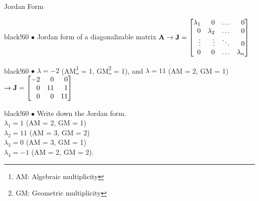 \documentclass[aspectratio=169]{beamer}
\def\mf{\ensuremath\mathbf}
\def\bmx{\ensuremath\begin{bmatrix*}[r]}
\def\emx{\ensuremath\end{bmatrix*}}
\newcommand{\demoex}[2]{\onslide<#1->\begin{color}{black!60} #2 \end{color}}
\begin{document}
\begin{frame}[t]{Jordan Form}
\begin{small}
\demoex{1}{
    $\bullet$ Jordan form of a diagonalizable matrix $\mf{A} \rightarrow \mf{J} = \bmx
    \lambda_1 & 0 & \ldots & 0\\
    0 & \lambda_2 & \ldots & 0\\
    \vdots & \vdots & \ddots & 0\\
    0 & 0 & \ldots & \lambda_n
    \emx$
}

\demoex{2}{
    $\bullet$ $\lambda = -2$ (AM\footnote{AM: Algebraic multiplicity} = 1, GM\footnote{GM: Geometric multiplicity} = 1), and $\lambda = 11$ (AM = 2, GM = 1) $\rightarrow \mf{J} = \bmx
    -2 & 0 & 0\\
    0 & 11 & 1\\
    0 & 0 & 11
    \emx$
}

\demoex{3}{
    $\bullet$ Write down the Jordan form.\\$\lambda_1 = 1$ (AM = 2, GM = 1)\\$\lambda_2 = 11$ (AM = 3, GM = 2)\\$\lambda_3 = 0$ (AM = 3, GM = 1)\\$\lambda_4 = -1$ (AM = 2, GM = 2). 
}
\end{small}
\end{frame}
\end{document}
